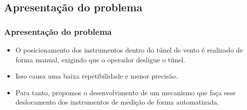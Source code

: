 \subsection{Apresentação do problema}

\begin{frame}
\frametitle{Apresentação do problema}
\begin{itemize}
    \item O posicionamento dos instrumentos dentro do túnel de vento é realizado de forma manual, exigindo que o operador desligue o túnel.
    \item Isso causa uma baixa repetibilidade e menor precisão. 
    \item Para tanto, propomos o desenvolvimento de um mecanismo que faça esse deslocamento dos instrumentos de medição de forma automatizada.
\end{itemize}
\end{frame}
